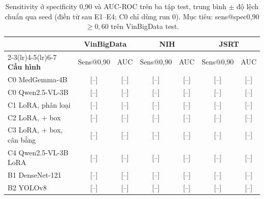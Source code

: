 \begin{table}[H]
\centering
\caption[Sensitivity ở specificity 0,90 và AUC-ROC trên ba tập test]{Sensitivity ở specificity 0,90 và AUC-ROC trên ba tập test, trung bình $\pm$ độ lệch chuẩn qua seed
(điền từ  sau E1--E4; C0 chỉ dùng run 0). Mục tiêu: sens@spec0,90 $\ge 0{,}60$ trên
VinBigData test.}
\label{tab:main}
\small
\begin{tabular}{@{}l cc cc cc@{}}
\toprule
& \multicolumn{2}{c}{\textbf{VinBigData}} & \multicolumn{2}{c}{\textbf{NIH}} & \multicolumn{2}{c}{\textbf{JSRT}} \\
\cmidrule(lr){2-3}\cmidrule(lr){4-5}\cmidrule(lr){6-7}
\textbf{Cấu hình} & Sens@0,90 & AUC & Sens@0,90 & AUC & Sens@0,90 & AUC \\
\midrule
C0 MedGemma-4B   & \textcolor{badred}{[--]} & \textcolor{badred}{[--]} & \textcolor{badred}{[--]} & \textcolor{badred}{[--]} & \textcolor{badred}{[--]} & \textcolor{badred}{[--]} \\
C0 Qwen2.5-VL-3B & \textcolor{badred}{[--]} & \textcolor{badred}{[--]} & \textcolor{badred}{[--]} & \textcolor{badred}{[--]} & \textcolor{badred}{[--]} & \textcolor{badred}{[--]} \\
C1 LoRA, phân loại & \textcolor{badred}{[--]} & \textcolor{badred}{[--]} & \textcolor{badred}{[--]} & \textcolor{badred}{[--]} & \textcolor{badred}{[--]} & \textcolor{badred}{[--]} \\
C2 LoRA, + box     & \textcolor{badred}{[--]} & \textcolor{badred}{[--]} & \textcolor{badred}{[--]} & \textcolor{badred}{[--]} & \textcolor{badred}{[--]} & \textcolor{badred}{[--]} \\
C3 LoRA, + box, cân bằng & \textcolor{badred}{[--]} & \textcolor{badred}{[--]} & \textcolor{badred}{[--]} & \textcolor{badred}{[--]} & \textcolor{badred}{[--]} & \textcolor{badred}{[--]} \\
C4 Qwen2.5-VL-3B LoRA & \textcolor{badred}{[--]} & \textcolor{badred}{[--]} & \textcolor{badred}{[--]} & \textcolor{badred}{[--]} & \textcolor{badred}{[--]} & \textcolor{badred}{[--]} \\
\midrule
B1 DenseNet-121 & \textcolor{badred}{[--]} & \textcolor{badred}{[--]} & \textcolor{badred}{[--]} & \textcolor{badred}{[--]} & \textcolor{badred}{[--]} & \textcolor{badred}{[--]} \\
B2 YOLOv8       & \textcolor{badred}{[--]} & \textcolor{badred}{[--]} & \textcolor{badred}{[--]} & \textcolor{badred}{[--]} & \textcolor{badred}{[--]} & \textcolor{badred}{[--]} \\
\bottomrule
\end{tabular}
\end{table}

